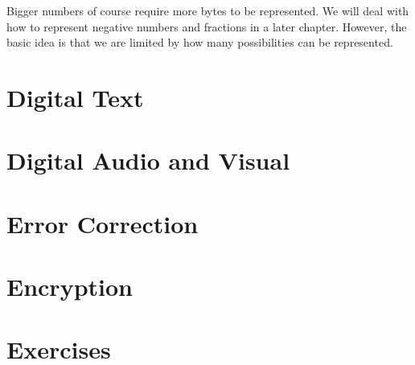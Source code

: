 Bigger numbers of course require more bytes to be represented. We will deal with how to represent negative numbers and fractions in a later chapter. However, the basic idea is that we are limited by how many possibilities can be represented.

\section{Digital Text}

\section{Digital Audio and Visual}

\begin{center}\end{center}


\begin{center}\end{center}
\begin{center}\end{center}
\begin{center}\end{center}
\begin{center}\end{center}
\begin{center}\end{center}
\begin{center}\end{center}

\section{Error Correction}

\begin{center}\end{center}

\section{Encryption}

\section{Exercises}

